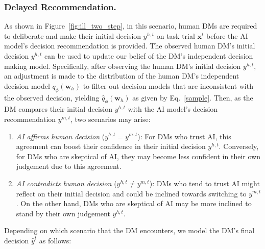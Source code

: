 \documentclass[letterpaper]{article} %
\begin{document}
\subsubsection{Delayed Recommendation.}
As shown in Figure~\ref{fig:ill_two_step}, in this scenario, human DMs are required to deliberate and make their initial decision $y^{h,t}$ on task trial $\bm{x}^t$ before the AI model's decision recommendation is provided. The observed human DM's initial decision $y^{h,t}$ can be used to update our belief of the DM's independent decision making model.  
Specifically, after observing the human DM's initial decision $y^{h,t}$, an adjustment is made to the distribution of the human DM's independent decision model $q_{\phi}(\bm{w}_h)$ to filter out decision models that are inconsistent with the observed decision, yielding $\hat{q}_{\phi}(\bm{w}_h)$ as given by Eq.~\ref{sample}.
Then, as the DM compares their initial decision $y^{h,t}$ with the AI model's decision recommendation $y^{m,t}$, 
two scenarios may arise:
\begin{enumerate}
    \item \emph{AI affirms human decision} ($y^{h,t} = y^{m,t}$): For DMs who trust AI, this agreement can boost their confidence in their initial decision $y^{h,t}$. Conversely, for DMs who are skeptical of AI, they may become less confident in their own judgement due to this agreement. 
    
    \item \emph{AI contradicts human decision} ($y^{h,t} \neq y^{m,t} $): 
    DMs who tend to trust AI might reflect on their initial decision and could be inclined towards switching to $y^{m,t}$. On the other hand, DMs who are skeptical of AI may be more inclined to stand by their own judgement $y^{h,t}$.  


\end{enumerate}
Depending on which scenario that the DM encounters, we model the DM's final decision $\hat{y}^{t}$ as follows: 
\end{document}
